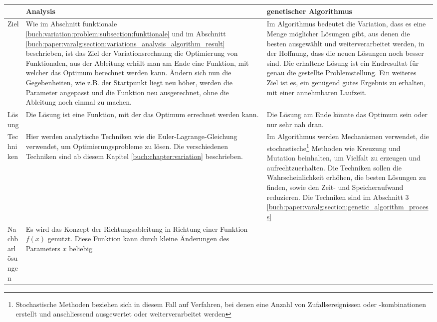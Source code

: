\begin{xltabular}{\textwidth}{|L|X|X|}
    \hline
    & Analysis 
    & genetischer Algorithmus 
    \\ \hline
    Ziel
    & 
    Wie im Abschnitt funktionale \ref{buch:variation:problem:subsection:funktionale} und
    im Abschnitt \ref{buch:paper:varalg:section:variations_analysis_algorithm_result}
    beschrieben, ist das Ziel der Variationsrechnung die Optimierung von Funktionalen, aus der
    Ableitung erhält man am Ende eine Funktion, mit welcher das Optimum berechnet werden kann. 
    Ändern sich nun die Gegebenheiten, wie z.B. der Startpunkt liegt neu höher, werden die Parameter 
    angepasst und die Funktion neu ausgerechnet, ohne die Ableitung noch einmal zu machen.
    & 
    Im Algorithmus bedeutet die Variation, dass es eine Menge möglicher Lösungen gibt, 
    aus denen die besten ausgewählt und weiterverarbeitet werden, in der 
    Hoffnung, dass die neuen Lösungen noch besser sind. Die erhaltene Lösung ist ein Endresultat für
    genau die gestellte Problemstellung. Ein weiteres Ziel ist es,
    ein genügend gutes Ergebnis zu erhalten, mit einer annehmbaren Laufzeit.
    \\ \hline
    Lösung
    & 
    Die Lösung ist eine Funktion, mit der das Optimum errechnet werden kann.
    & 
    Die Lösung am Ende könnte das Optimum sein oder nur sehr nah dran.
    \\ \hline
    Techniken  
    & 
    Hier werden analytische Techniken wie die Euler-Lagrange-Gleichung verwendet, 
    um Optimierungsprobleme zu lösen. Die verschiedenen Techniken sind ab diesem Kapitel
    \ref{buch:chapter:variation} beschrieben.
    & Im Algorithmus werden Mechanismen verwendet, die stochastische\footnote{
        Stochastische Methoden beziehen sich in diesem Fall auf Verfahren, bei denen 
        eine Anzahl von Zufallsereignissen oder -kombinationen erstellt und anschliessend 
        ausgewertet oder weiterverarbeitet werden
    }
    Methoden wie Kreuzung und Mutation beinhalten, um Vielfalt zu erzeugen und aufrechtzuerhalten.
    Die Techniken sollen die Wahrscheinlichkeit erhöhen, die besten Lösungen zu finden, 
    sowie den Zeit- und Speicheraufwand reduzieren.
    Die Techniken sind im Abschnitt 3 \ref{buch:paper:varalg:section:genetic_algorithm_process}
    \\ \hline
    Nachbarlösungen
    & 
    Es wird das Konzept der Richtungsableitung in Richtung einer Funktion \(f(x)\)
    genutzt. Diese Funktion kann durch kleine Änderungen des Parameters \(x\) beliebig

\end{xltabular}
